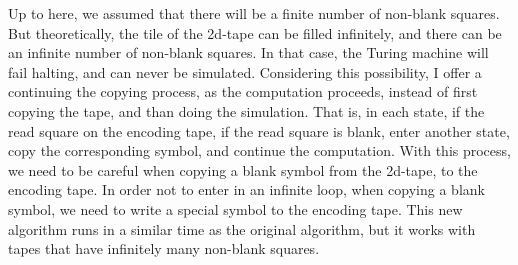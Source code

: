 \documentclass[12pt]{article}
\begin{document}
Up to here, we assumed that there will be a finite number of non-blank squares. But theoretically, the tile of the 2d-tape can be filled infinitely, and there can be an infinite number of non-blank squares. In that case, the Turing machine will fail halting, and can never be simulated. Considering this possibility, I offer a continuing the copying process, as the computation proceeds, instead of first copying the tape, and than doing the simulation. That is, in each state, if the read square on the encoding tape, if the read square is blank, enter another state, copy the corresponding symbol, and continue the computation. With this process, we need to be careful when copying a blank symbol from the 2d-tape, to the encoding tape. In order not to enter in an infinite loop, when copying a blank symbol, we need to write a special symbol to the encoding tape. This new algorithm runs in a similar time as the original algorithm, but it works with tapes that have infinitely many non-blank squares.
\end{document}

